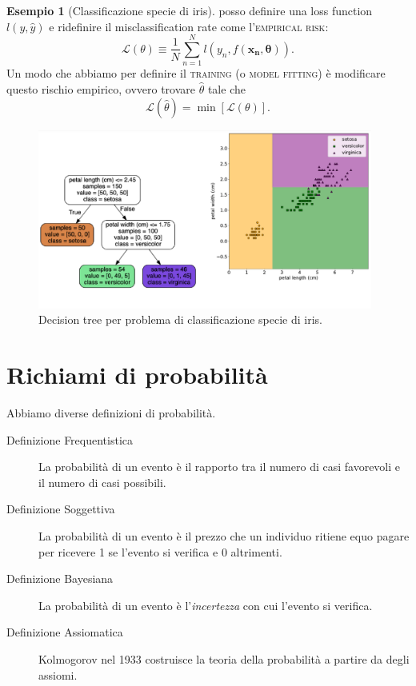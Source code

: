 \documentclass[10pt]{article}
\newcommand{\ve}[1]{\bm{#1}}
\newcommand{\im}[1]{\textsc{#1}}
\theoremstyle{definition}
\newtheorem{example}{Esempio}[section]
\begin{document}
\begin{example}[Classificazione specie di iris]
posso definire una loss function $l(y, \hat{y})$ e ridefinire il
misclassification rate come l'\im{empirical risk}:
\begin{equation}\label{eq:misclassification-rate}
\mathcal{L}(\theta) \equiv \frac{1}{N}\sum_{n=1}^N l\left( y_n, f(\ve{x_n}, \ve{\theta}) \right).
\end{equation}
Un modo che abbiamo per definire il \im{training} (o \im{model fitting}) è
modificare questo rischio empirico, ovvero trovare $\hat{\theta}$ tale che
\begin{equation}
\mathcal{L}(\hat{\theta}) = \min[\mathcal{L}(\theta)].
\end{equation}

\begin{figure}
\includegraphics[width=0.98\textwidth]{Images/iris_decision_tree.PNG}
\caption{Decision tree per problema di classificazione specie di iris.}\label{fig:iris-decision-tree}
\end{figure}

\end{example}

\section{Richiami di probabilità}
Abbiamo diverse definizioni di probabilità.
\begin{description}
\item[Definizione Frequentistica] La probabilità di un evento è il rapporto tra il numero di casi favorevoli e il numero di casi possibili.
\item[Definizione Soggettiva] La probabilità di un evento è il prezzo che un individuo ritiene equo pagare per ricevere 1 se l'evento si verifica e 0 altrimenti.
\item[Definizione Bayesiana] La probabilità di un evento è l'\textit{incertezza} con cui l'evento si verifica.
\item[Definizione Assiomatica] Kolmogorov nel 1933 costruisce la teoria della probabilità a partire da degli assiomi.
\end{description}
\end{document}
